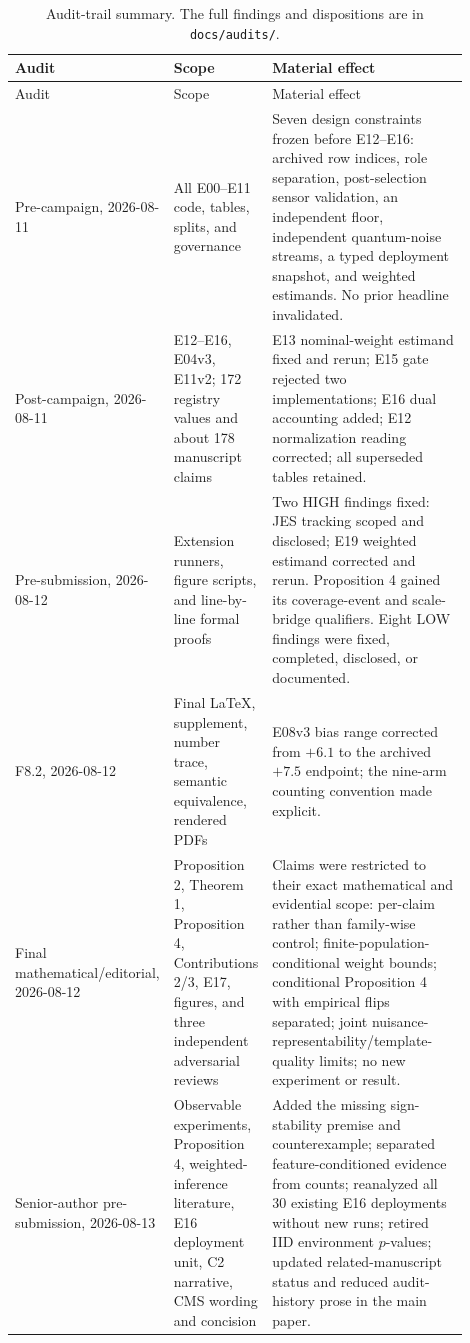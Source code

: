 \documentclass[11pt,a4paper]{article}
\begin{document}
\small
\begin{longtable}{>{\raggedright\arraybackslash}p{0.19\linewidth}>{\raggedright\arraybackslash}p{0.20\linewidth}>{\raggedright\arraybackslash}p{0.51\linewidth}}
\caption{Audit-trail summary. The full findings and dispositions are in \texttt{docs/audits/}.}\label{tab:audit-trail}\\
\toprule
Audit & Scope & Material effect \\
\midrule
\endfirsthead
\toprule
Audit & Scope & Material effect \\
\midrule
\endhead
Pre-campaign, 2026-08-11 & All E00--E11 code, tables, splits, and governance & Seven design constraints frozen before E12--E16: archived row indices, role separation, post-selection sensor validation, an independent floor, independent quantum-noise streams, a typed deployment snapshot, and weighted estimands. No prior headline invalidated. \\
Post-campaign, 2026-08-11 & E12--E16, E04v3, E11v2; 172 registry values and about 178 manuscript claims & E13 nominal-weight estimand fixed and rerun; E15 gate rejected two implementations; E16 dual accounting added; E12 normalization reading corrected; all superseded tables retained. \\
Pre-submission, 2026-08-12 & Extension runners, figure scripts, and line-by-line formal proofs & Two HIGH findings fixed: JES tracking scoped and disclosed; E19 weighted estimand corrected and rerun. Proposition 4 gained its coverage-event and scale-bridge qualifiers. Eight LOW findings were fixed, completed, disclosed, or documented. \\
F8.2, 2026-08-12 & Final LaTeX, supplement, number trace, semantic equivalence, rendered PDFs & E08v3 bias range corrected from $+6.1$ to the archived $+7.5$ endpoint; the nine-arm counting convention made explicit. \\
Final mathematical/editorial, 2026-08-12 & Proposition 2, Theorem 1, Proposition 4, Contributions 2/3, E17, figures, and three independent adversarial reviews & Claims were restricted to their exact mathematical and evidential scope: per-claim rather than family-wise control; finite-population-conditional weight bounds; conditional Proposition 4 with empirical flips separated; joint nuisance-representability/template-quality limits; no new experiment or result. \\
Senior-author pre-submission, 2026-08-13 & Observable experiments, Proposition 4, weighted-inference literature, E16 deployment unit, C2 narrative, CMS wording and concision & Added the missing sign-stability premise and counterexample; separated feature-conditioned evidence from counts; reanalyzed all 30 existing E16 deployments without new runs; retired IID environment $p$-values; updated related-manuscript status and reduced audit-history prose in the main paper. \\

\end{longtable}
\end{document}
